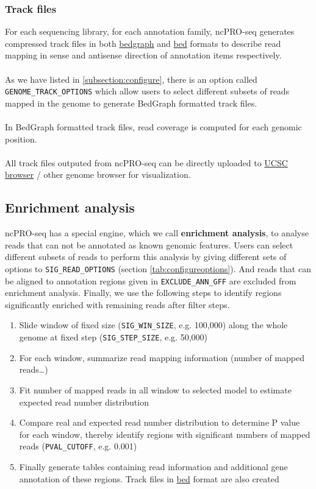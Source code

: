 \documentclass[12pt]{article}
\def \ncpip{ncPRO-seq}
\begin{document}
\subsubsection{Track files}
For each sequencing library,  for each annotation family, \ncpip{} generates compressed track files in both \href{http://genome.ucsc.edu/goldenPath/help/bedgraph.html}{bedgraph} and \href{http://genome.ucsc.edu/goldenPath/help/bed.html}{bed} formats to describe read mapping in sense and antisense direction of annotation items respectively. \\\\
As we have listed in \ref{subsection:configure}, there is an option called \verb+GENOME_TRACK_OPTIONS+ which allow users to select different subsets of reads mapped in the genome to generate BedGraph formatted track files.\\\\
In BedGraph formatted track files, read coverage is computed for each genomic position. \\\\
All track files outputed from \ncpip{} can be directly uploaded to \href{http://genome.ucsc.edu/index.html}{ UCSC browser} / other genome browser for visualization.

\subsection{Enrichment analysis}
\label{subsection:enrichmentanalysis}
\ncpip{} has a special engine, which we call \textbf{enrichment analysis}, to analyse reads that can not be annotated as known genomic features. Users can select different subsets of reads to perform this analysis by giving different sets of options to \verb+SIG_READ_OPTIONS+ (section \ref{tab:configureoptions}). And reads that can be aligned to annotation regions given in \verb+EXCLUDE_ANN_GFF+ are excluded from enrichment analysis. Finally, we use the following steps to identify regions significantly enriched with remaining reads after filter steps.

\begin{enumerate}
 \item Slide window of fixed size  (\verb+SIG_WIN_SIZE+, e.g. 100,000) along the whole genome at fixed step (\verb+SIG_STEP_SIZE+, e.g. 50,000)
 \item For each window, summarize read mapping information (number of mapped reads\ldots)
 \item Fit number of mapped reads in all window to selected model to estimate expected read number distribution
 \item Compare real and expected read number distribution to determine P value for each window, thereby identify regions with significant numbers of mapped reads (\verb+PVAL_CUTOFF+, e.g. 0.001)
 \item Finally generate tables containing read information and additional gene annotation of these regions. Track files in \href{http://genome.ucsc.edu/FAQ/FAQformat.html#format1}{bed} format are also created
\end{enumerate}
\end{document}
